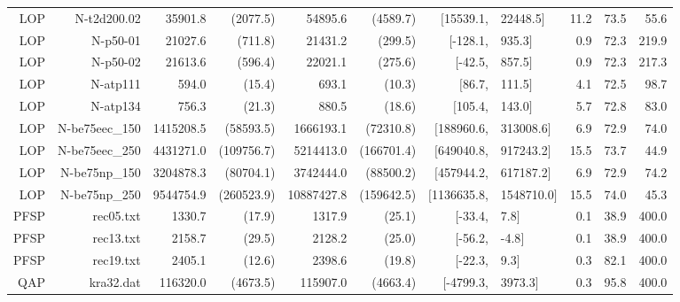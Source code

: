 \documentclass[runningheads]{llncs}
\begin{document}
\begin{table}
{\begin{tabular}{*{6}{r}rl*{3}{r}}
    LOP &    N-t2d200.02 &      35901.8&(2077.5) &       54895.6&(4589.7) &     $[$15539.1,&22448.5$]$ &         11.2 &          73.5 &                 55.6 \\
    LOP &       N-p50-01 &       21027.6&(711.8) &        21431.2&(299.5) &        $[$-128.1,&935.3$]$ &          0.9 &          72.3 &                219.9 \\
    LOP &       N-p50-02 &       21613.6&(596.4) &        22021.1&(275.6) &         $[$-42.5,&857.5$]$ &          0.9 &          72.3 &                217.3 \\
    LOP &       N-atp111 &          594.0&(15.4) &           693.1&(10.3) &          $[$86.7,&111.5$]$ &          4.1 &          72.5 &                 98.7 \\
    LOP &       N-atp134 &          756.3&(21.3) &           880.5&(18.6) &         $[$105.4,&143.0$]$ &          5.7 &          72.8 &                 83.0 \\
    LOP &  N-be75eec\_150 &   1415208.5&(58593.5) &    1666193.1&(72310.8) &   $[$188960.6,&313008.6$]$ &          6.9 &          72.9 &                 74.0 \\
    LOP &  N-be75eec\_250 &  4431271.0&(109756.7) &   5214413.0&(166701.4) &   $[$649040.8,&917243.2$]$ &         15.5 &          73.7 &                 44.9 \\
    LOP &   N-be75np\_150 &   3204878.3&(80704.1) &    3742444.0&(88500.2) &   $[$457944.2,&617187.2$]$ &          6.9 &          72.9 &                 74.2 \\
    LOP &   N-be75np\_250 &  9544754.9&(260523.9) &  10887427.8&(159642.5) & $[$1136635.8,&1548710.0$]$ &         15.5 &          74.0 &                 45.3 \\
   PFSP &      rec05.txt &         1330.7&(17.9) &          1317.9&(25.1) &           $[$-33.4,&7.8$]$ &          0.1 &          38.9 &                400.0 \\
   PFSP &      rec13.txt &         2158.7&(29.5) &          2128.2&(25.0) &          $[$-56.2,&-4.8$]$ &          0.1 &          38.9 &                400.0 \\
   PFSP &      rec19.txt &         2405.1&(12.6) &          2398.6&(19.8) &           $[$-22.3,&9.3$]$ &          0.3 &          82.1 &                400.0 \\
    QAP &      kra32.dat &     116320.0&(4673.5) &      115907.0&(4663.4) &      $[$-4799.3,&3973.3$]$ &          0.3 &          95.8 &                400.0 \\

\end{tabular}}
\end{table}
\end{document}
